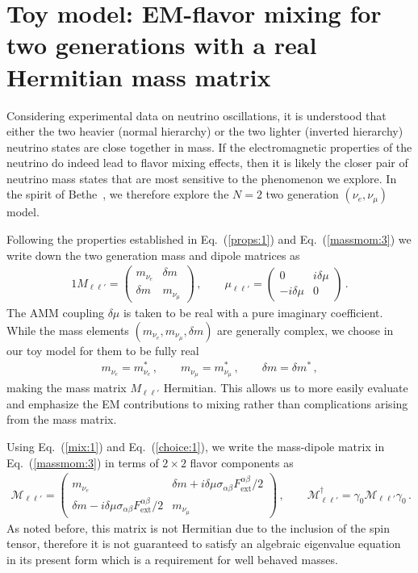 \documentclass[addchapnum]{ws-rv961x669} %
\newcommand{\req}[1]{Eq.~(\ref{#1})}
\begin{document}
\section{Toy model: EM-flavor mixing for two generations with a real Hermitian mass matrix}
\label{sec:toy}
Considering experimental data on neutrino oscillations, it is understood that either the two heavier (normal hierarchy) or the two lighter (inverted hierarchy) neutrino states are close together in mass. If the electromagnetic properties of the neutrino do indeed lead to flavor mixing effects, then it is likely the closer pair of neutrino mass states that are most sensitive to the phenomenon we explore. In the spirit of Bethe~\cite{Bethe:1986ej}, we therefore explore the $N=2$ two generation $(\nu_{e},\nu_{\mu})$ model.

Following the properties established in \req{props:1} and \req{massmom:3} we write down the two generation mass and dipole matrices as
\begin{alignat}{1}
\label{mix:1} M_{\ell\ell'}= 
\begin{pmatrix}
m_{\nu_{e}} & {\delta m}\\
{\delta m} & m_{\nu_{\mu}}
\end{pmatrix}\,,\qquad
\mu_{\ell\ell'} = 
\begin{pmatrix}
0 & i\delta\mu\\
-i\delta\mu & 0
\end{pmatrix}\,.
\end{alignat}
The AMM coupling $\delta\mu$ is taken to be real with a pure imaginary coefficient. While the mass elements $(m_{\nu_{e}},m_{\nu_{\mu}},{\delta m})$ are generally complex, we choose in our toy model for them to be fully real
\begin{align}
\label{choice:1}
m_{\nu_{e}}=m_{\nu_{e}}^{*}\,,\qquad
m_{\nu_{\mu}}=m_{\nu_{\mu}}^{*}\,,\qquad
\delta m=\delta m^{*}\,,
\end{align}
making the mass matrix $M_{\ell\ell'}$ Hermitian. This allows us to more easily evaluate and emphasize the EM contributions to mixing rather than complications arising from the mass matrix.

Using \req{mix:1} and \req{choice:1}, we write the mass-dipole matrix in \req{massmom:3} in terms of $2\times2$ flavor components as
\begin{align}
\label{mix:2}
\mathcal{M}_{\ell\ell'} = 
\begin{pmatrix}
m_{\nu_{e}} & {\delta m}+i\delta\mu\sigma_{\alpha\beta}F^{\alpha\beta}_\mathrm{ext}/2\\
{\delta m}-i\delta\mu\sigma_{\alpha\beta}F^{\alpha\beta}_\mathrm{ext}/2 & m_{\nu_{\mu}}
\end{pmatrix}\,,\qquad
\mathcal{M}_{\ell\ell'}^{\dag}=\gamma_{0}\mathcal{M}_{\ell\ell'}\gamma_{0}\,.
\end{align}
As noted before, this matrix is not Hermitian due to the inclusion of the spin tensor, therefore it is not guaranteed to satisfy an algebraic eigenvalue equation in its present form which is a requirement for well behaved masses.
\end{document}
